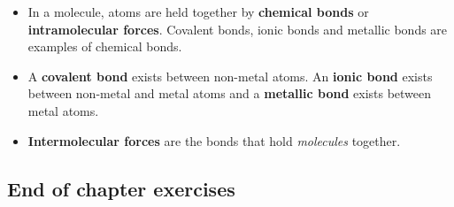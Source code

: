 \begin{itemize}[noitemsep]
{model} is also a 3-dimensional molecular model. The atoms are 
represented by spheres.
\label{m38120*uid77}\item In a molecule, atoms are held together by \textbf{chemical bonds} or \textbf{intramolecular forces}. Covalent bonds, ionic bonds and 
metallic bonds are examples of chemical bonds.
\label{m38120*uid78}\item A \textbf{covalent bond} 
exists between non-metal atoms. An \textbf{ionic bond} 
exists between non-metal and metal atoms and a \textbf{metallic 
bond} exists between metal atoms.
\label{m38120*uid79}\item \textbf{Intermolecular 
forces} are the bonds that hold \textsl{molecules} together.
\end{itemize}
\label{m38120*secfhsst!!!underscore!!!id497}
            \subsection{ End of chapter exercises}
            \nopagebreak
